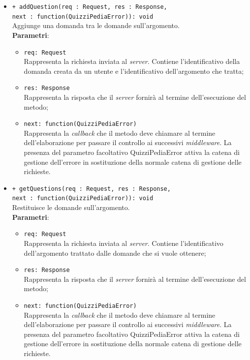 \begin{itemize}
\begin{itemize}
\begin{itemize}
			\end{itemize}
			\item \texttt{+ addQuestion(req : Request, res : Response, \\next : function(QuizziPediaError)): void} \\
			Aggiunge una domanda tra le domande sull'argomento.  \\
			\textbf{Parametri}:
			\begin{itemize}
			\item \texttt{req: Request} \\
			Rappresenta la richiesta inviata al \textit{server}. Contiene l'identificativo della domanda creata da un utente e l'identificativo dell'argomento che tratta;
			\item \texttt{res: Response} \\
			Rappresenta la risposta che il \textit{server} fornirà al termine dell'esecuzione del metodo;
			\item \texttt{next: function(QuizziPediaError)} \\
			Rappresenta la \textit{callback} che il metodo deve chiamare al termine dell'elaborazione per passare il controllo ai successivi \textit{middleware}. La presenza del parametro facoltativo QuizziPediaError attiva la catena di gestione dell'errore in sostituzione della normale catena di gestione delle richieste.
			\end{itemize}
			\item \texttt{+ getQuestions(req : Request, res : Response, \\next : function(QuizziPediaError)): void} \\
			Restituisce le domande sull'argomento.  \\
			\textbf{Parametri}:
			\begin{itemize}
			\item \texttt{req: Request} \\
			Rappresenta la richiesta inviata al \textit{server}. Contiene l'identificativo dell'argomento trattato dalle domande che si vuole ottenere;
			\item \texttt{res: Response} \\
			Rappresenta la risposta che il \textit{server} fornirà al termine dell'esecuzione del metodo;
			\item \texttt{next: function(QuizziPediaError)} \\
			Rappresenta la \textit{callback} che il metodo deve chiamare al termine dell'elaborazione per passare il controllo ai successivi \textit{middleware}. La presenza del parametro facoltativo QuizziPediaError attiva la catena di gestione dell'errore in sostituzione della normale catena di gestione delle richieste.

\end{itemize}
\end{itemize}
\end{itemize}
